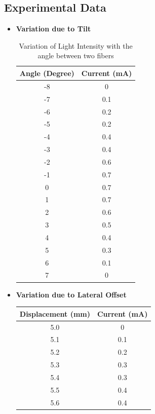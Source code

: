 \subsection{Experimental Data}
\begin{itemize}
    \item \textbf{Variation due to Tilt}
    \begin{table}[H]
    \centering
    \begin{tabular}{|c|c|}
        \hline
        \textbf{Angle (Degree)} & \textbf{Current (mA)} \\
        \hline
            -8 & 0 \\
            -7 & 0.1 \\
            -6 & 0.2 \\
            -5 & 0.2 \\
            -4 & 0.4 \\
            -3 & 0.4 \\
            -2 & 0.6 \\
            -1 & 0.7 \\
            0 & 0.7 \\
            1 & 0.7 \\
            2 & 0.6 \\
            3 & 0.5 \\
            4 & 0.4 \\
            5 & 0.3 \\
            6 & 0.1 \\
            7 & 0 \\
        \hline
        \end{tabular}
        \caption{Variation of Light Intensity with the angle between two fibers}
    \end{table}
\pagebreak
    \item \textbf{Variation due to Lateral Offset}
    \begin{table}[H]
    \centering
    \begin{tabular}{|c|c|}
        \hline
        \textbf{Displacement (mm)} & \textbf{Current (mA)} \\
        \hline
        5.0 & 0 \\
        5.1 & 0.1 \\
        5.2 & 0.2 \\
        5.3 & 0.3 \\
        5.4 & 0.3 \\
        5.5 & 0.4 \\
        5.6 & 0.4 \\

\end{tabular}
\end{table}
\end{itemize}
